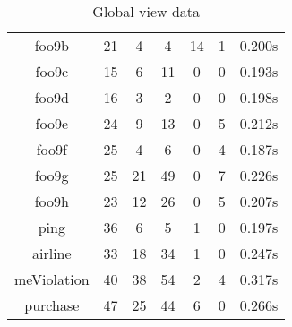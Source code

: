 \begin{table}[h]
\begin{tabular}{|c|c|c|c|c|c|c|}
foo9b & 21 & 4 & 4 & 14 & 1 & 0.200s \\ 
foo9c & 15 & 6 & 11 & 0 & 0 & 0.193s \\ 
foo9d & 16 & 3 & 2 & 0 & 0 & 0.198s \\ 
foo9e & 24 & 9 & 13 & 0 & 5 & 0.212s \\ 
foo9f & 25 & 4 & 6 & 0 & 4 & 0.187s \\ 
foo9g & 25 & 21 & 49 & 0 & 7 & 0.226s \\ 
foo9h & 23 & 12 & 26 & 0 & 5 & 0.207s \\ 
ping & 36 & 6 & 5 & 1 & 0 & 0.197s \\ 
airline & 33 & 18 & 34 & 1 & 0 & 0.247s \\ 
meViolation & 40 & 38 & 54 & 2 & 4 & 0.317s \\ 
purchase & 47 & 25 & 44 & 6 & 0 & 0.266s \\ 
\hline
\end{tabular}
\caption{Global view data}
\label{tab:gvbench}
\end{table}